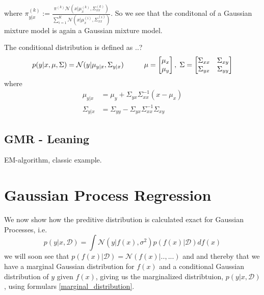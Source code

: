 where $\pi_{y|x}^{(k)} := \frac{\pi^{(k)} \mathcal{N}(x|\mu_{x}^{(k)},\Sigma_{xx}^{(k)})}
{\sum_{i=1}^K \mathcal{N}(x|\mu_{x}^{(i)},\Sigma_{xx}^{(i)})}$. So we see that 
the conditonal of a Gaussian mixture model is again a Gaussian mixture model.


\begin{testexample2}
    The conditional distribution is defined as \cite{bishop} ..?
    $$p(y|x,\mu, \Sigma) = \mathcal{N}(y|\mu_{y|x},\Sigma_{y|x} )\hspace{1cm} \mu=\begin{bmatrix}
        \mu_x \\ \mu_y
    \end{bmatrix},\hspace{0.1cm} \Sigma = \begin{bmatrix}
        \Sigma_{xx} & \Sigma_{xy}\\ \Sigma_{yx}& \Sigma_{yy}
    \end{bmatrix}$$ 
    where 
    \begin{align}
        \mu_{y|x} &= \mu_y+\Sigma_{yx}\Sigma_{xx}^{-1}(x-\mu_x)\\
        \Sigma_{y|x} &= \Sigma_{yy}-\Sigma_{yx}\Sigma_{xx}^{-1}\Sigma_{xy} 
    \end{align}
    
\end{testexample2}


\subsection{GMR - Leaning}

EM-algorithm, classic example. 

\section{Gaussian Process Regression}
We now show how the preditive distribution is calculated exact for
Gaussian Processes, i.e. 
\begin{equation}\label{GP_predictive}
    p(y|x,\mathcal{D}) = \int \mathcal{N}(y|f(x), \sigma^2) p(f(x)|\mathcal{D})df(x)
\end{equation}
we will soon see that $p(f(x)|\mathcal{D}) = \mathcal{N}(f(x)| .., ...)$ and
and thereby that we have a marginal Gaussian distribution for $f(x)$ and a 
conditional Gaussian distribution of $y$ given $f(x)$, giving us the marginalized
distribtuion, $p(y|x,\mathcal{D})$, using formulars \eqref{marginal_distribution}. 


